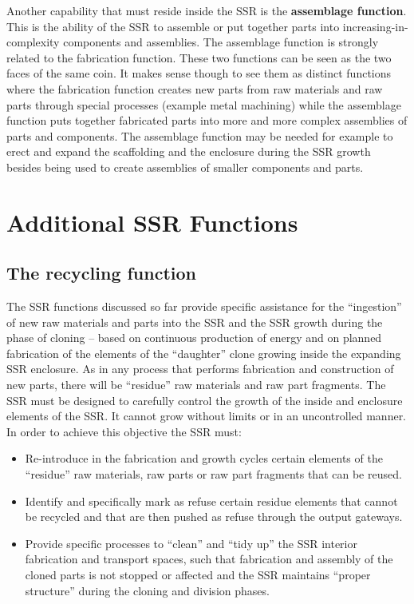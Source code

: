 \hypertarget{RefHeading3076306210128}{}Another capability that must
reside inside the SSR is the \textbf{assemblage function}. This is the
ability of the SSR to assemble or put together parts into
increasing-in-complexity components and assemblies. The assemblage
function is strongly related to the fabrication function. These two
functions can be seen as the two faces of the same coin. It makes sense
though to see them as distinct functions where the fabrication function
creates new parts from raw materials and raw parts through special
processes (example metal machining) while the assemblage function puts
together fabricated parts into more and more complex assemblies of
parts and components. The assemblage function may be needed for example
to erect and expand the scaffolding and the enclosure during the SSR
growth besides being used to create assemblies of smaller components
and parts.

\section{Additional SSR Functions}

\subsection[The recycling function]{The recycling function}

\hypertarget{RefHeading3080306210128}{}The SSR functions discussed so
far provide specific assistance for the “ingestion” of new raw
materials and parts into the SSR and the SSR growth during the phase of
cloning – based on continuous production of energy and on planned
fabrication of the elements of the “daughter” clone growing inside the
expanding SSR enclosure. As in any process that performs fabrication
and construction of new parts, there will be “residue” raw materials
and raw part fragments.  The SSR must be designed to carefully control
the growth of the inside and enclosure elements of the SSR. It cannot
grow without limits or in an uncontrolled manner. In order to achieve
this objective the SSR must:

\begin{itemize}
\item Re-introduce in the fabrication and growth cycles certain elements
of the “residue” raw materials, raw parts or raw part fragments that
can be reused.
\item Identify and specifically mark as refuse certain residue elements
that cannot be recycled and that are then pushed as refuse through the
output gateways.
\item Provide specific processes to “clean” and “tidy up” the SSR
interior fabrication and transport spaces, such that fabrication and
assembly of the cloned parts is not stopped or affected and the SSR
maintains “proper structure” during the cloning and division phases.
\end{itemize}

